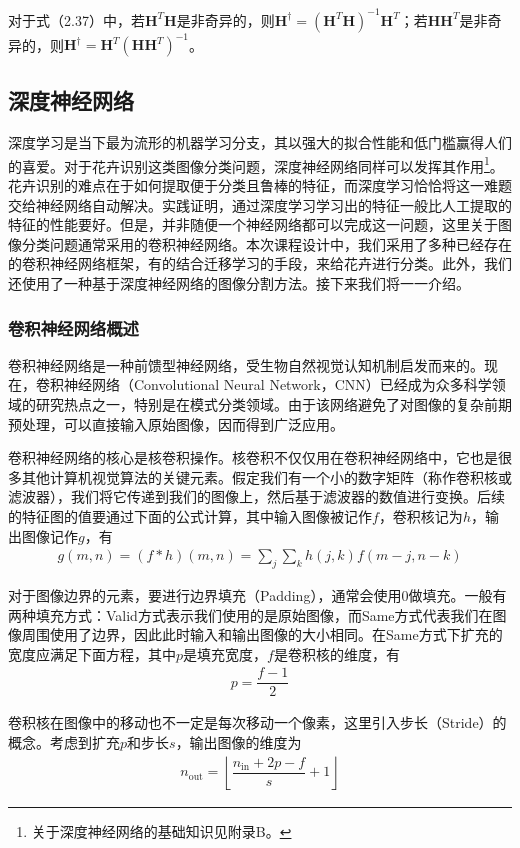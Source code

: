\documentclass[supercite]{HustGraduPaper}
\begin{document}
\begin{sloppypar}
  对于式（2.37）中，若$\mathbf{H}^T\mathbf{H}$是非奇异的，则$\mathbf{H}^{\dag}=(\mathbf{H}^T\mathbf{H})^{-1}\mathbf{H}^T$；若$\mathbf{H}\mathbf{H}^T$是非奇异的，则$\mathbf{H}^{\dag}=\mathbf{H}^T(\mathbf{H}\mathbf{H}^T)^{-1}$。
  \subsection{深度神经网络}
  深度学习是当下最为流形的机器学习分支，其以强大的拟合性能和低门槛赢得人们的喜爱。对于花卉识别这类图像分类问题，深度神经网络同样可以发挥其作用\footnote{关于深度神经网络的基础知识见附录B。}。花卉识别的难点在于如何提取便于分类且鲁棒的特征，而深度学习恰恰将这一难题交给神经网络自动解决。实践证明，通过深度学习学习出的特征一般比人工提取的特征的性能要好。但是，并非随便一个神经网络都可以完成这一问题，这里关于图像分类问题通常采用的卷积神经网络。本次课程设计中，我们采用了多种已经存在的卷积神经网络框架，有的结合迁移学习的手段，来给花卉进行分类。此外，我们还使用了一种基于深度神经网络的图像分割方法。接下来我们将一一介绍。
  \subsubsection{卷积神经网络概述}
   卷积神经网络是一种前馈型神经网络，受生物自然视觉认知机制启发而来的。现在，卷积神经网络（Convolutional Neural Network，CNN）已经成为众多科学领域的研究热点之一，特别是在模式分类领域。由于该网络避免了对图像的复杂前期预处理，可以直接输入原始图像，因而得到广泛应用。
  

   卷积神经网络的核心是核卷积操作。核卷积不仅仅用在卷积神经网络中，它也是很多其他计算机视觉算法的关键元素。假定我们有一个小的数字矩阵（称作卷积核或滤波器），我们将它传递到我们的图像上，然后基于滤波器的数值进行变换。后续的特征图的值要通过下面的公式计算，其中输入图像被记作$f$，卷积核记为$h$，输出图像记作$g$，有\begin{gather}
    g(m,n)=(f*h)(m,n)=\sum\limits_j\sum\limits_kh(j,k)f(m-j,n-k)
   \end{gather}

   对于图像边界的元素，要进行边界填充（Padding），通常会使用0做填充。一般有两种填充方式：Valid方式表示我们使用的是原始图像，而Same方式代表我们在图像周围使用了边界，因此此时输入和输出图像的大小相同。在Same方式下扩充的宽度应满足下面方程，其中$p$是填充宽度，$f$是卷积核的维度，有\begin{gather}
    p=\dfrac{f-1}{2}
   \end{gather}

   卷积核在图像中的移动也不一定是每次移动一个像素，这里引入步长（Stride）的概念。考虑到扩充$p$和步长$s$，输出图像的维度为\begin{gather}
     n_{\mathrm{out}}=\left\lfloor \dfrac{n_{\mathrm{in}}+2p-f}{s}+1 \right\rfloor
   \end{gather}


\end{sloppypar}
\end{document}
